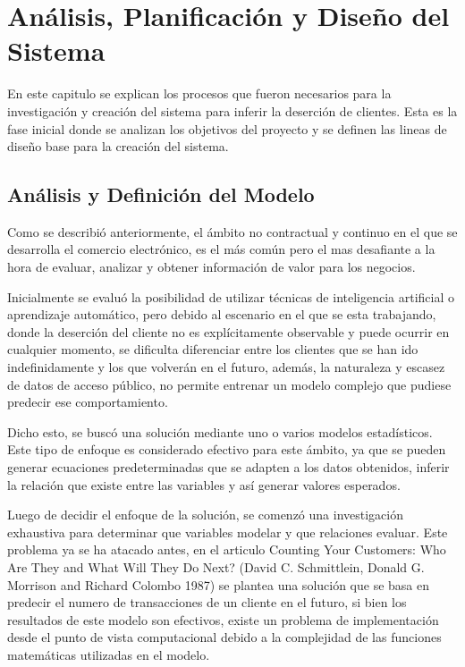 
\chapter{Análisis, Planificación y Diseño del Sistema}

En este capitulo se explican los procesos que fueron necesarios para la investigación y creación del sistema para inferir la deserción de clientes. Esta es la fase inicial donde se analizan los objetivos del proyecto y se definen las lineas de diseño base para la creación del sistema.

\section{Análisis y Definición del Modelo}

Como se describió anteriormente, el ámbito no contractual y continuo en el que se desarrolla el comercio electrónico, es el más común pero el mas desafiante a la hora de evaluar, analizar y obtener información de valor para los negocios. 

	Inicialmente se evaluó la posibilidad de utilizar técnicas de inteligencia artificial o aprendizaje automático, pero debido al escenario en el que se esta trabajando, donde la deserción del cliente no es explícitamente observable y puede ocurrir en cualquier momento, se dificulta diferenciar entre los clientes que se han ido indefinidamente y los que volverán en el futuro, además, la naturaleza y escasez de datos de acceso público, no permite entrenar un modelo complejo que pudiese predecir ese comportamiento.

	Dicho esto, se buscó una solución mediante uno o varios modelos estadísticos. Este tipo de enfoque es considerado efectivo para este ámbito, ya que se pueden generar ecuaciones predeterminadas que se adapten a los datos obtenidos, inferir la relación que existe entre las variables y así generar valores esperados.

	Luego de decidir el enfoque de la solución, se comenzó una investigación exhaustiva para determinar que variables modelar y que relaciones evaluar. Este problema ya se ha atacado antes, en el articulo Counting Your Customers: Who Are They and What Will They Do Next? (David C. Schmittlein, Donald G. Morrison and Richard Colombo 1987) se plantea una solución que se basa en predecir el numero de transacciones de un cliente en el futuro, si bien los resultados de este modelo son efectivos, existe un problema de implementación desde el punto de vista computacional debido a la complejidad de las funciones matemáticas utilizadas en el modelo.

